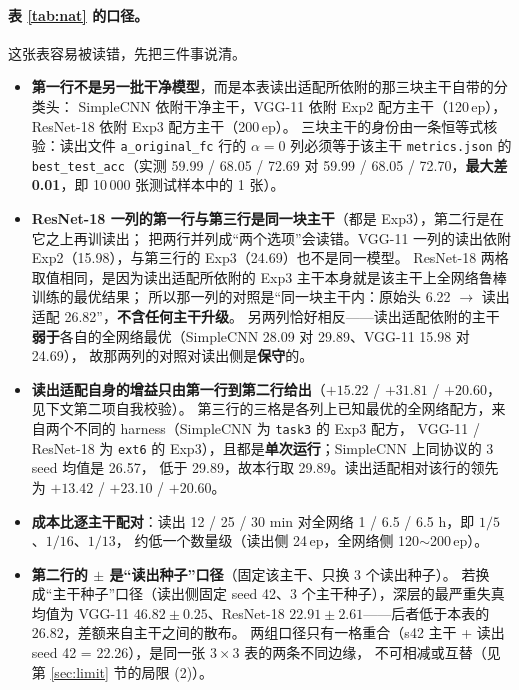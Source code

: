 \documentclass[11pt,a4paper]{ctexart}
\begin{document}
\paragraph{表 \ref{tab:nat} 的口径。}
这张表容易被读错，先把三件事说清。

\begin{itemize}[leftmargin=2em,itemsep=2pt]
  \item \textbf{第一行不是另一批干净模型}，而是本表读出适配所依附的那三块主干自带的分类头：
        SimpleCNN 依附干净主干，VGG-11 依附 Exp2 配方主干（120\,ep），ResNet-18 依附 Exp3 配方主干（200\,ep）。
        三块主干的身份由一条恒等式核验：读出文件 \texttt{a\_original\_fc} 行的 $\alpha=0$ 列必须等于该主干
        \texttt{metrics.json} 的 \texttt{best\_test\_acc}（实测 59.99 / 68.05 / 72.69
        对 59.99 / 68.05 / 72.70，\textbf{最大差 0.01}，即 10\,000 张测试样本中的 1 张）。
  \item \textbf{ResNet-18 一列的第一行与第三行是同一块主干}（都是 Exp3），第二行是在它之上再训读出；
        把两行并列成“两个选项”会读错。VGG-11 一列的读出依附 Exp2（15.98），与第三行的 Exp3（24.69）也不是同一模型。
        ResNet-18 两格取值相同，是因为读出适配所依附的 Exp3 主干本身就是该主干上全网络鲁棒训练的最优结果；
        所以那一列的对照是“同一块主干内：原始头 6.22 $\to$ 读出适配 26.82”，\textbf{不含任何主干升级}。
        另两列恰好相反——读出适配依附的主干\textbf{弱于}各自的全网络最优（SimpleCNN 28.09 对 29.89、VGG-11 15.98 对 24.69），
        故那两列的对照对读出侧是\textbf{保守}的。
  \item \textbf{读出适配自身的增益只由第一行到第二行给出}（$+15.22$ / $+31.81$ / $+20.60$，见下文第二项自我校验）。
        第三行的三格是各列上已知最优的全网络配方，来自两个不同的 harness（SimpleCNN 为 \texttt{task3} 的 Exp3 配方，
        VGG-11 / ResNet-18 为 \texttt{ext6} 的 Exp3），且都是\textbf{单次运行}；SimpleCNN 上同协议的 3 seed 均值是 26.57，
        低于 29.89，故本行取 29.89。读出适配相对该行的领先为 $+13.42$ / $+23.10$ / $+20.60$。
  \item \textbf{成本比逐主干配对}：读出 12 / 25 / 30 min 对全网络 1 / 6.5 / 6.5 h，即 $1/5$、$1/16$、$1/13$，
        约低一个数量级（读出侧 24\,ep，全网络侧 120$\sim$200\,ep）。
  \item \textbf{第二行的 $\pm$ 是“读出种子”口径}（固定该主干、只换 3 个读出种子）。
        若换成“主干种子”口径（读出侧固定 seed 42、3 个主干种子），深层的最严重失真均值为
        VGG-11 $46.82\pm0.25$、ResNet-18 $22.91\pm2.61$——后者低于本表的 $26.82$，差额来自主干之间的散布。
        两组口径只有一格重合（s42 主干 + 读出 seed 42 = 22.26），是同一张 $3\times3$ 表的两条不同边缘，
        不可相减或互替（见第 \ref{sec:limit} 节的局限 (2)）。
\end{itemize}
\end{document}
